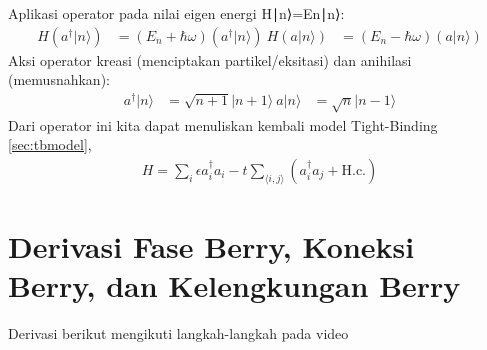 Aplikasi operator pada nilai eigen energi H∣n⟩=En​∣n⟩:
\begin{align}
H (a^\dagger |n\rangle) &= (E_n + \hbar\omega) (a^\dagger |n\rangle) \
H (a |n\rangle) &= (E_n - \hbar\omega) (a |n\rangle)
\end{align}
Aksi operator kreasi (menciptakan partikel/eksitasi) dan anihilasi (memusnahkan):
\begin{align}
a^\dagger |n\rangle &= \sqrt{n+1} |n+1\rangle \
a |n\rangle &= \sqrt{n} |n-1\rangle
\end{align}
Dari operator ini kita dapat menuliskan kembali model Tight-Binding \ref{sec:tbmodel},
\[
\begin{aligned}
  H =\sum_i \epsilon a^{\dagger}_{i} a_{i} -t \sum_{\langle i,j \rangle} \left( a^{\dagger}_{i} a_{j} + \text{H.c.} \right) 
    \end{aligned}
\]

\section{Derivasi Fase Berry, Koneksi Berry, dan Kelengkungan Berry}

Derivasi berikut mengikuti langkah-langkah pada video \parencite{profnano2025berry}

